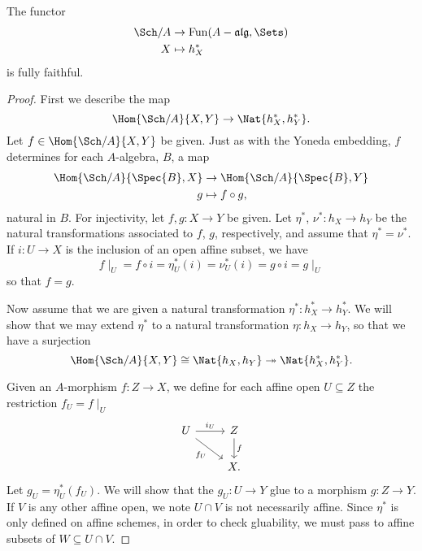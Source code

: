 \documentclass[10pt]{amsart}
\begin{document}
\begin{prop}
  The functor
  \begin{align*}
    \Sch/A &\rightarrow \operatorname{Fun}({A-\mathfrak{alg}}, \Sets)\\
    X &\mapsto h_X^*
  \end{align*}
  is fully faithful.
  \begin{proof}
    First we describe the map
    $$\Hom{\Sch/A}{X,Y} \rightarrow \Nat{h_X^*, h_Y^*}.$$
    Let $f \in \Hom{\Sch/A}{X,Y}$ be given.
    Just as with the Yoneda embedding, $f$ determines for each $A$-algebra, $B$, a map
    \begin{align*}
      \Hom{\Sch/A}{\Spec{B},X} &\rightarrow \Hom{\Sch/A}{\Spec{B},Y}\\
      g &\mapsto f \circ g,
    \end{align*}
    natural in $B$.
    For injectivity, let $f,g : X \rightarrow Y$ be given.
    Let $\eta^*$, $\nu^* : h_X \rightarrow h_Y$ be the natural transformations associated to $f$, $g$, respectively, and assume that $\eta^* = \nu^*$.
    If $i : U \rightarrow X$ is the inclusion of an open affine subset, we have
    $$f\mid_U = f \circ i = \eta^*_U(i) = \nu^*_U(i) = g \circ i = g\mid_U$$
    so that $f = g$.
    
    Now assume that we are given a natural transformation $\eta^* \colon h_X^* \rightarrow h_Y^*$.
    We will show that we may extend $\eta^*$ to a natural transformation $\eta : h_X \rightarrow h_Y$, so that we have a surjection
    $$\Hom{\Sch/A}{X,Y} \cong \Nat{h_X, h_Y} \twoheadrightarrow \Nat{h_X^*, h_Y^*}.$$

    Given an $A$-morphism $f : Z \rightarrow X$, we define for each affine open $U \subseteq Z$ the restriction $f_U = f\mid_U$
    $$\begin{tikzcd}
      U \arrow{r}{i_U} \arrow[swap]{rd}{f_U} & Z\arrow{d}{f}\\
      & X.
    \end{tikzcd}$$
    Let $g_U = \eta^*_U(f_U)$.
    We will show that the $g_U : U \rightarrow Y$ glue to a morphism $g : Z \rightarrow Y$.
    If $V$ is any other affine open, we note $U \cap V$ is not necessarily affine.
    Since $\eta^*$ is only defined on affine schemes, in order to check gluability, we must pass to affine subsets of $W \subseteq U \cap V$.
    

\end{proof}
\end{prop}
\end{document}
